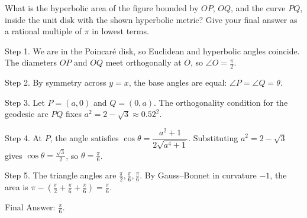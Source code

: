 What is the hyperbolic area of the figure bounded by $OP$, $OQ$, and the curve $PQ$, inside the unit disk with the shown hyperbolic metric? Give your final answer as a rational multiple of $\pi$ in lowest terms.

Step 1. We are in the Poincaré disk, so Euclidean and hyperbolic angles coincide. The diameters $OP$ and $OQ$ meet orthogonally at $O$, so $\angle O=\tfrac{\pi}{2}$.

Step 2. By symmetry across $y=x$, the base angles are equal: $\angle P=\angle Q=\theta$.

Step 3. Let $P=(a,0)$ and $Q=(0,a)$. The orthogonality condition for the geodesic arc $PQ$ fixes $a^2=2-\sqrt{3}\approx0.52^2$.

Step 4. At $P$, the angle satisfies $\cos\theta=\dfrac{a^2+1}{2\sqrt{a^4+1}}$. Substituting $a^2=2-\sqrt{3}$ gives $\cos\theta=\tfrac{\sqrt{3}}{2}$, so $\theta=\tfrac{\pi}{6}$.

Step 5. The triangle angles are $\tfrac{\pi}{2},\tfrac{\pi}{6},\tfrac{\pi}{6}$. By Gauss–Bonnet in curvature $-1$, the area is $\pi-(\tfrac{\pi}{2}+\tfrac{\pi}{6}+\tfrac{\pi}{6})=\tfrac{\pi}{6}$.

Final Answer: $\tfrac{\pi}{6}$.